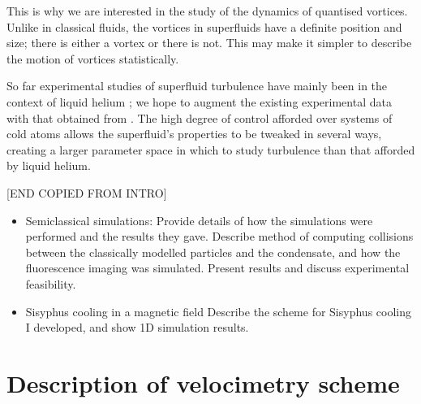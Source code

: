 This is why we are interested in the study of the dynamics of quantised vortices. Unlike in classical fluids, the vortices in superfluids have a definite position and size; there is either a vortex or there is not. This may make it simpler to describe the motion of vortices statistically.

So far experimental studies of superfluid turbulence have mainly been in the context of liquid helium \cite{leggett_superfluidity_1999}; we hope to augment the existing experimental data with that obtained from \bec. The high degree of control afforded over systems of cold atoms allows the superfluid's properties to be tweaked in several ways, creating a larger parameter space in which to study turbulence than that afforded by liquid helium.


[END COPIED FROM INTRO]


\begin{itemize}
\item Semiclassical simulations:
Provide details of how the simulations were performed and the results they gave. Describe method of computing collisions between the classically modelled particles and the condensate, and how the fluorescence imaging was simulated. Present results and discuss experimental feasibility.

\item{Sisyphus cooling in a magnetic field}
Describe the scheme for Sisyphus cooling I developed, and show 1D simulation results.

\end{itemize}


\section{Description of velocimetry scheme}

